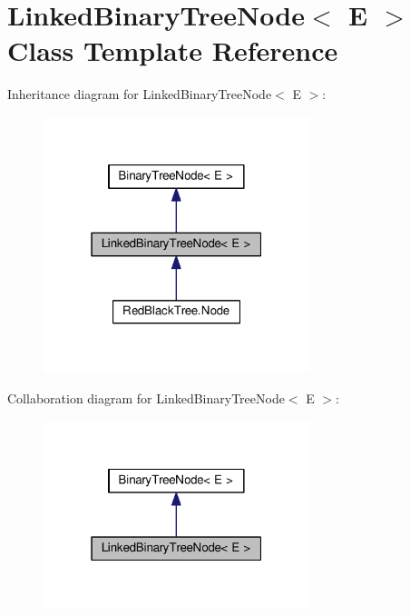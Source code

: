 \hypertarget{class_linked_binary_tree_node}{}\section{Linked\+Binary\+Tree\+Node$<$ E $>$ Class Template Reference}
\label{class_linked_binary_tree_node}


Inheritance diagram for Linked\+Binary\+Tree\+Node$<$ E $>$\+:
\nopagebreak
\begin{figure}[H]
\begin{center}
\leavevmode
\includegraphics[width=220pt]{class_linked_binary_tree_node__inherit__graph}
\end{center}
\end{figure}


Collaboration diagram for Linked\+Binary\+Tree\+Node$<$ E $>$\+:
\nopagebreak
\begin{figure}[H]
\begin{center}
\leavevmode
\includegraphics[width=220pt]{class_linked_binary_tree_node__coll__graph}
\end{center}
\end{figure}
